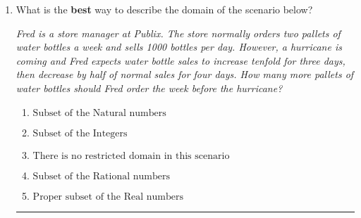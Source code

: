 \documentclass[14pt]{extbook}
\newcommand{\litem}[1]{\item#1\hspace*{-1cm}\rule{\textwidth}{0.4pt}}
\begin{document}
\begin{enumerate}
{\begin{enumerate}[label=\Alph*.]
\end{enumerate} }
\litem{
What is the \textbf{best} way to describe the domain of the scenario below?
\begin{center}
    \textit{ Fred is a store manager at Publix. The store normally orders two pallets of water bottles a week and sells 1000 bottles per day. However, a hurricane is coming and Fred expects water bottle sales to increase tenfold for three days, then decrease by half of normal sales for four days. How many more pallets of water bottles should Fred order the week before the hurricane? }
\end{center}
\begin{enumerate}[label=\Alph*.]
\item \( \text{Subset of the Natural numbers} \)
\item \( \text{Subset of the Integers} \)
\item \( \text{There is no restricted domain in this scenario} \)
\item \( \text{Subset of the Rational numbers} \)
\item \( \text{Proper subset of the Real numbers} \)

\end{enumerate} }
\end{enumerate}
\end{document}
